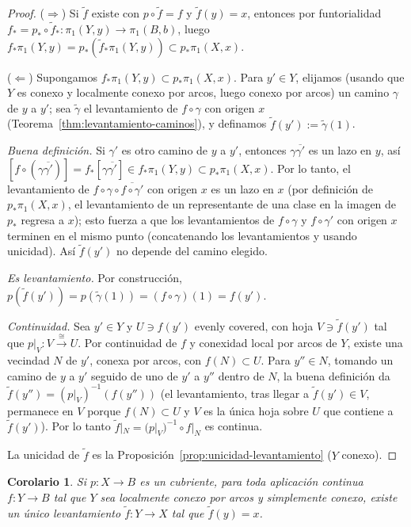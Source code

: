 \documentclass[11pt,a4paper]{article}
\theoremstyle{plain}
\newtheorem{corollary}[theorem]{Corolario}
\theoremstyle{definition}
\theoremstyle{remark}
\begin{document}
\begin{proof}
($\Rightarrow$) Si $\tilde f$ existe con $p\circ\tilde f=f$ y
$\tilde f(y)=x$, entonces por funtorialidad
$f_*=p_*\circ\tilde f_*:\pi_1(Y,y)\to\pi_1(B,b)$, luego
$f_*\pi_1(Y,y)=p_*(\tilde f_*\pi_1(Y,y))\subset p_*\pi_1(X,x)$.

($\Leftarrow$) Supongamos $f_*\pi_1(Y,y)\subset p_*\pi_1(X,x)$. Para
$y'\in Y$, elijamos (usando que $Y$ es conexo y localmente conexo por
arcos, luego conexo por arcos) un camino $\gamma$ de $y$ a $y'$; sea
$\tilde\gamma$ el levantamiento de $f\circ\gamma$ con origen $x$
(Teorema~\ref{thm:levantamiento-caminos}), y definamos
$\tilde f(y'):=\tilde\gamma(1)$.

\emph{Buena definición.} Si $\gamma'$ es otro camino de $y$ a $y'$,
entonces $\gamma\overline{\gamma'}$ es un lazo en $y$, así
$[f\circ(\gamma\overline{\gamma'})]=f_*[\gamma\overline{\gamma'}]\in f_*\pi_1(Y,y)\subset p_*\pi_1(X,x)$.
Por lo tanto, el levantamiento de $f\circ\gamma\circ\overline{f\circ\gamma'}$
con origen $x$ es un lazo en $x$ (por definición de $p_*\pi_1(X,x)$, el
levantamiento de un representante de una clase en la imagen de $p_*$
regresa a $x$); esto fuerza a que los levantamientos de $f\circ\gamma$ y
$f\circ\gamma'$ con origen $x$ terminen en el mismo punto (concatenando
los levantamientos y usando unicidad). Así $\tilde f(y')$ no depende del
camino elegido.

\emph{Es levantamiento.} Por construcción, $p(\tilde f(y'))=p(\tilde\gamma(1))=(f\circ\gamma)(1)=f(y')$.

\emph{Continuidad.} Sea $y'\in Y$ y $U\ni f(y')$ evenly covered, con hoja
$V\ni\tilde f(y')$ tal que $p|_V:V\xrightarrow{\cong}U$. Por continuidad de
$f$ y conexidad local por arcos de $Y$, existe una vecindad $N$ de $y'$,
conexa por arcos, con $f(N)\subset U$. Para $y''\in N$, tomando un camino
de $y$ a $y'$ seguido de uno de $y'$ a $y''$ dentro de $N$, la buena
definición da $\tilde f(y'')=(p|_V)^{-1}(f(y''))$ (el levantamiento, tras
llegar a $\tilde f(y')\in V$, permanece en $V$ porque $f(N)\subset U$ y
$V$ es la única hoja sobre $U$ que contiene a $\tilde f(y')$). Por lo
tanto $\tilde f|_N=(p|_V)^{-1}\circ f|_N$ es continua.

La unicidad de $\tilde f$ es la Proposición~\ref{prop:unicidad-levantamiento}
($Y$ conexo).
\end{proof}

\begin{corollary}
\label{cor:levantamiento-simplemente-conexo}
Si $p:X\to B$ es un cubriente, para toda aplicación continua $f:Y\to B$ tal
que $Y$ sea localmente conexo por arcos y simplemente conexo, existe un
único levantamiento $\tilde f:Y\to X$ tal que $\tilde f(y)=x$.
\end{corollary}
\end{document}
